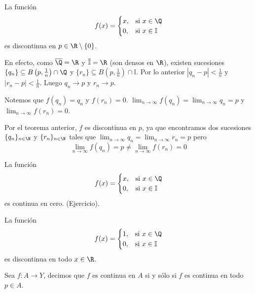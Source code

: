 \begin{example} %
La función
$$ f(x) = \begin{cases} x, & \text{si } x \in \Q \\ 0, & \text{si } x \in \mathbb{I} \end{cases} $$ %
es discontinua en $p \in \R \setminus \{0\}$. %

En efecto, como $\overline{\Q} = \R$ y $\overline{\mathbb{I}} = \R$ (son densos en $\R$), existen sucesiones $\{q_n\} \subseteq B\left(p, \frac{1}{n}\right) \cap \Q$ y $\{r_n\} \subseteq B\left(p, \frac{1}{n}\right) \cap \mathbb{I}$. %
Por lo anterior $|q_n - p| < \frac{1}{n}$ y $|r_n - p| < \frac{1}{n}$. Luego $q_n \to p$ y $r_n \to p$. %

Notemos que $f(q_n) = q_n$ y $f(r_n) = 0$. %
$\lim_{n \to \infty} f(q_n) = \lim_{n \to \infty} q_n = p$ y $\lim_{n \to \infty} f(r_n) = 0$. %

Por el teorema anterior, $f$ es discontinua en $p$, ya que encontramos dos sucesiones $\{q_n\}_{n \in \N}$ y $\{r_n\}_{n \in \N}$ tales que $\lim_{n \to \infty} q_n = \lim_{n \to \infty} r_n = p$ pero %
$$ \lim_{n \to \infty} f(q_n) = p \neq \lim_{n \to \infty} f(r_n) = 0 $$ %
\end{example}

\begin{example} %
La función
$$ f(x) = \begin{cases} x, & \text{si } x \in \Q \\ 0, & \text{si } x \in \mathbb{I} \end{cases} $$ %
es continua en cero. (Ejercicio). %
\end{example}

\begin{example} %
La función
$$ f(x) = \begin{cases} 1, & \text{si } x \in \Q \\ 0, & \text{si } x \in \mathbb{I} \end{cases} $$ %
es discontinua en todo $x \in \R$. %
\end{example}

\begin{definicion}[Continuidad en $A$] %
Sea $f: A \to Y$, decimos que $f$ es continua en $A$ si y sólo si $f$ es continua en todo $p \in A$. %
\end{definicion}


